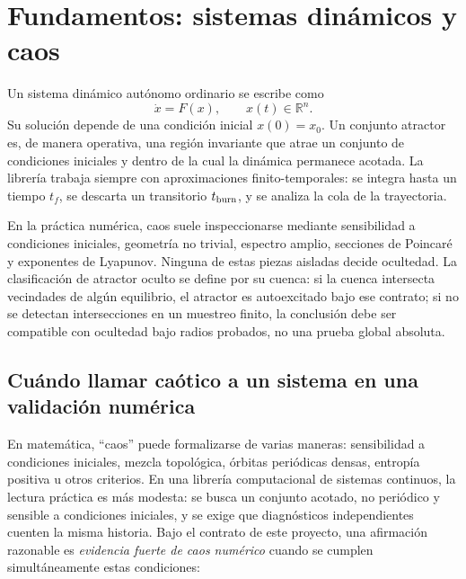 \documentclass[11pt]{article}
\newcommand{\R}{\mathbb{R}}
\begin{document}
\section{Fundamentos: sistemas dinámicos y caos}

Un sistema dinámico autónomo ordinario se escribe como
\[
\dot{x}=F(x), \qquad x(t)\in\R^n.
\]
Su solución depende de una condición inicial \(x(0)=x_0\). Un conjunto
atractor es, de manera operativa, una región invariante que atrae un conjunto
de condiciones iniciales y dentro de la cual la dinámica permanece acotada.
La librería trabaja siempre con aproximaciones finito-temporales: se integra
hasta un tiempo \(t_f\), se descarta un transitorio \(t_{\rm burn}\), y se
analiza la cola de la trayectoria.

En la práctica numérica, caos suele inspeccionarse mediante sensibilidad a
condiciones iniciales, geometría no trivial, espectro amplio, secciones de
Poincaré y exponentes de Lyapunov. Ninguna de estas piezas aisladas decide
ocultedad. La clasificación de atractor oculto se define por su cuenca: si la
cuenca intersecta vecindades de algún equilibrio, el atractor es
autoexcitado bajo ese contrato; si no se detectan intersecciones en un
muestreo finito, la conclusión debe ser compatible con ocultedad bajo radios
probados, no una prueba global absoluta.

\subsection{Cuándo llamar caótico a un sistema en una validación numérica}

En matemática, ``caos'' puede formalizarse de varias maneras: sensibilidad a
condiciones iniciales, mezcla topológica, órbitas periódicas densas, entropía
positiva u otros criterios. En una librería computacional de sistemas
continuos, la lectura práctica es más modesta: se busca un conjunto acotado,
no periódico y sensible a condiciones iniciales, y se exige que diagnósticos
independientes cuenten la misma historia. Bajo el contrato de este proyecto,
una afirmación razonable es \emph{evidencia fuerte de caos numérico} cuando se
cumplen simultáneamente estas condiciones:
\end{document}
